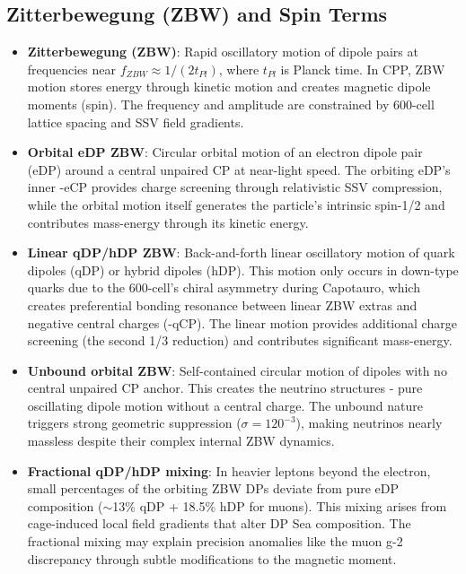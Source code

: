 \documentclass{article}
\begin{document}
\subsection{Zitterbewegung (ZBW) and Spin Terms}

\begin{itemize}
\item \textbf{Zitterbewegung (ZBW)}: Rapid oscillatory motion of dipole pairs at frequencies near $f_{ZBW} \approx 1/(2t_{Pl})$, where $t_{Pl}$ is Planck time. In CPP, ZBW motion stores energy through kinetic motion and creates magnetic dipole moments (spin). The frequency and amplitude are constrained by 600-cell lattice spacing and SSV field gradients.

\item \textbf{Orbital eDP ZBW}: Circular orbital motion of an electron dipole pair (eDP) around a central unpaired CP at near-light speed. The orbiting eDP's inner -eCP provides charge screening through relativistic SSV compression, while the orbital motion itself generates the particle's intrinsic spin-1/2 and contributes mass-energy through its kinetic energy.

\item \textbf{Linear qDP/hDP ZBW}: Back-and-forth linear oscillatory motion of quark dipoles (qDP) or hybrid dipoles (hDP). This motion only occurs in down-type quarks due to the 600-cell's chiral asymmetry during Capotauro, which creates preferential bonding resonance between linear ZBW extras and negative central charges (-qCP). The linear motion provides additional charge screening (the second 1/3 reduction) and contributes significant mass-energy.

\item \textbf{Unbound orbital ZBW}: Self-contained circular motion of dipoles with no central unpaired CP anchor. This creates the neutrino structures - pure oscillating dipole motion without a central charge. The unbound nature triggers strong geometric suppression ($\sigma = 120^{-3}$), making neutrinos nearly massless despite their complex internal ZBW dynamics.

\item \textbf{Fractional qDP/hDP mixing}: In heavier leptons beyond the electron, small percentages of the orbiting ZBW DPs deviate from pure eDP composition ($\sim$13\% qDP + 18.5\% hDP for muons). This mixing arises from cage-induced local field gradients that alter DP Sea composition. The fractional mixing may explain precision anomalies like the muon g-2 discrepancy through subtle modifications to the magnetic moment.
\end{itemize}
\end{document}

